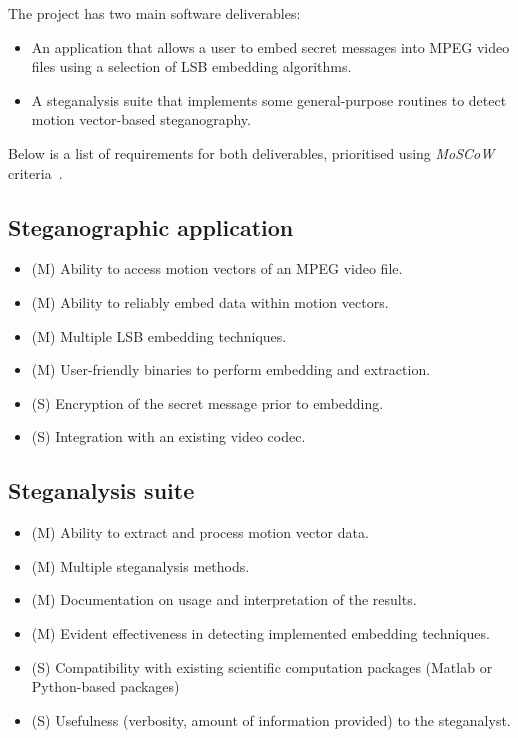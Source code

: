 \documentclass[12pt,british,twoside,notitlepage,usenames,dvipsnames,hypens,final]{report}
\numberwithin{equation}{section}
\numberwithin{figure}{section}
\begin{document}
The project has two main software deliverables:
\begin{itemize}
\item  An application that allows a user to embed secret messages into MPEG video files using a selection of LSB embedding algorithms.
\item A steganalysis suite that implements some general-purpose routines to detect motion vector-based steganography.
\end{itemize}

Below is a list of requirements for both deliverables, prioritised using \emph{MoSCoW} criteria~\cite{softid-notes}.

\subsection{Steganographic application}
\label{req-steg-app}
\begin{itemize}
\item (M) Ability to access motion vectors of an MPEG video file.
\item (M) Ability to reliably embed data within motion vectors.
\item (M) Multiple LSB embedding techniques.
\item (M) User-friendly binaries to perform embedding and extraction.
\item (S) Encryption of the secret message prior to embedding.
\item (S) Integration with an existing video codec.
\end{itemize}

\subsection{Steganalysis suite}
\label{req-steg-suite}
\begin{itemize}
\item (M) Ability to extract and process motion vector data.
\item (M) Multiple steganalysis methods.
\item (M) Documentation on usage and interpretation of the results.
\item (M) Evident effectiveness in detecting implemented embedding techniques.
\item (S) Compatibility with existing scientific computation packages (Matlab or Python-based packages)
\item (S) Usefulness (verbosity, amount of information provided) to the steganalyst.
\end{itemize}
\end{document}
